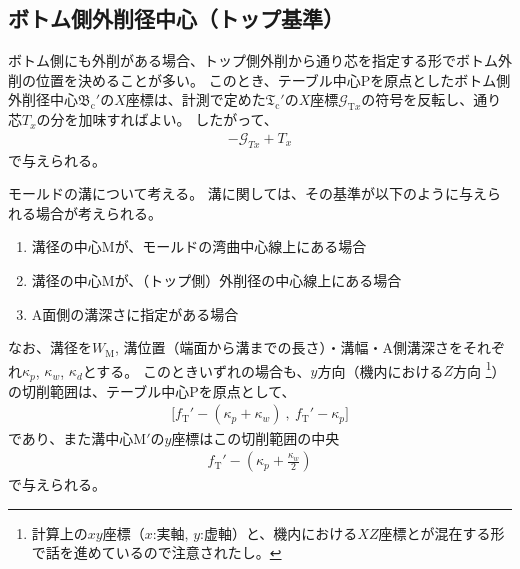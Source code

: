 \subsection{ボトム側外削径中心（トップ基準）}
ボトム側にも外削がある場合、トップ側外削から通り芯を指定する形でボトム外削の位置を決めることが多い。
このとき、テーブル中心Pを原点としたボトム側外削径中心$\mathfrak B_\mathrm c'$の$X$座標は、計測で定めた$\mathfrak T_\mathrm c'$の$X$座標$\mathcal G_{\mathrm Tx}$の符号を反転し、通り芯$T_x$の分を加味すればよい。
したがって、
\begin{align*}
  -\mathcal G_{Tx}+T_x
\end{align*}
で与えられる。





モールドの溝について考える。
溝に関しては、その基準が以下のように与えられる場合が考えられる。
\begin{enumerate}
\item 溝径の中心Mが、モールドの湾曲中心線上にある場合
\item 溝径の中心Mが、（トップ側）外削径の中心線上にある場合
\item A面側の溝深さに指定がある場合
\end{enumerate}
なお、溝径を$W_\mathrm M$, 溝位置（端面から溝までの長さ）・溝幅・A側溝深さをそれぞれ$\kappa_p$, $\kappa_w$, $\kappa_d$とする。
このときいずれの場合も、$y$方向（機内における$Z$方向
\footnote{計算上の$xy$座標（$x$:実軸, $y$:虚軸）と、機内における$XZ$座標とが混在する形で話を進めているので注意されたし。}）
の切削範囲は、テーブル中心Pを原点として、
\begin{align*}
  \big[f_\mathrm T'-(\kappa_p+\kappa_w)\ ,\ f_\mathrm T'-\kappa_p\big]
\end{align*}
であり、また溝中心M$'$の$y$座標はこの切削範囲の中央
\begin{align*}
  f_\mathrm T'-\left(\kappa_p+\frac{\kappa_w}2\right)
\end{align*}
で与えられる。



